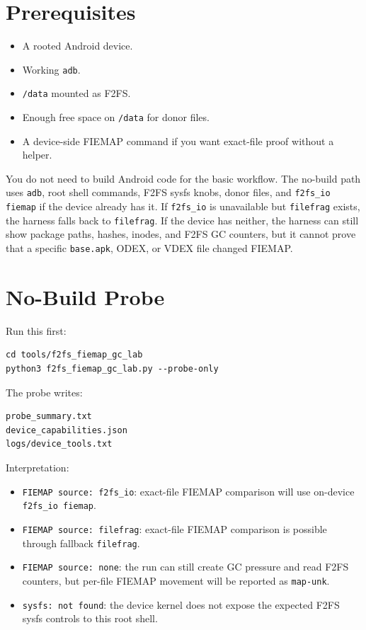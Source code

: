 \documentclass[11pt]{article}
\begin{document}
\section{Prerequisites}

\begin{itemize}
\item A rooted Android device.
\item Working \texttt{adb}.
\item \texttt{/data} mounted as F2FS.
\item Enough free space on \texttt{/data} for donor files.
\item A device-side FIEMAP command if you want exact-file proof without a helper.
\end{itemize}

You do not need to build Android code for the basic workflow.  The no-build path
uses \texttt{adb}, root shell commands, F2FS sysfs knobs, donor files, and
\texttt{f2fs\_io fiemap} if the device already has it.  If \texttt{f2fs\_io}
is unavailable but \texttt{filefrag} exists, the harness falls back to
\texttt{filefrag}.  If the device has neither, the harness can still show
package paths, hashes, inodes, and F2FS GC counters, but it cannot prove that a
specific \texttt{base.apk}, ODEX, or VDEX file changed FIEMAP.

\section{No-Build Probe}

Run this first:

\begin{verbatim}
cd tools/f2fs_fiemap_gc_lab
python3 f2fs_fiemap_gc_lab.py --probe-only
\end{verbatim}

The probe writes:

\begin{verbatim}
probe_summary.txt
device_capabilities.json
logs/device_tools.txt
\end{verbatim}

Interpretation:

\begin{itemize}[nosep]
\item \texttt{FIEMAP source: f2fs\_io}: exact-file FIEMAP comparison will use
      on-device \texttt{f2fs\_io fiemap}.
\item \texttt{FIEMAP source: filefrag}: exact-file FIEMAP comparison is possible
      through fallback \texttt{filefrag}.
\item \texttt{FIEMAP source: none}: the run can still create GC pressure and read
      F2FS counters, but per-file FIEMAP movement will be reported as
      \texttt{map-unk}.
\item \texttt{sysfs: not found}: the device kernel does not expose the expected
      F2FS sysfs controls to this root shell.
\end{itemize}
\end{document}
